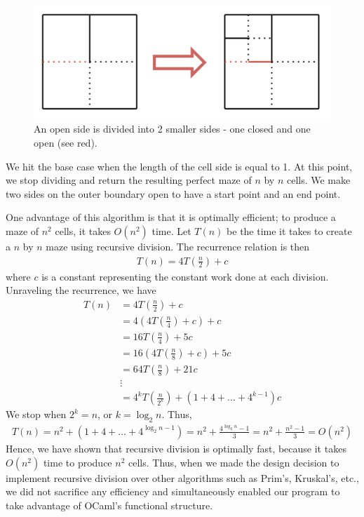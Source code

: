 \documentclass[11pt, margin=1in]{article}
\newcommand{\tab}{\par \qquad}
\begin{document}
\begin{figure}[H]
\begin{center}
\includegraphics[scale=0.7]{gen2.jpg}
\end{center}
\caption{An open side is divided into 2 smaller sides - one closed and one open (see red).}
\end{figure}

We hit the base case when the length of the cell side is equal to 1.  At this point, we stop dividing and return the resulting perfect maze of $n$ by $n$ cells.  We make two sides on the outer boundary open to have a start point and an end point.    

\tab One advantage of this algorithm is that it is optimally efficient; to produce a maze of $n^2$ cells, it takes $O(n^2)$ time.  Let $T(n)$ be the time it takes to create a $n$ by $n$ maze using recursive division.  The recurrence relation is then
\begin{align*}
T(n) = 4T\left(\frac{n}{2}\right) + c
\end{align*}  
where $c$ is a constant representing the constant work done at each division.  Unraveling the recurrence, we have
\begin{align*}
T(n) &= 4T\left(\frac{n}{2}\right) + c \\
&= 4\left(4T\left(\frac{n}{4}\right) + c\right) + c \\ 
&= 16 T\left(\frac{n}{4}\right) + 5c \\
&= 16 \left(4T\left(\frac{n}{8}\right) + c\right) + 5c \\ 
&= 64 T\left(\frac{n}{8}\right) + 21c \\
& \vdots \\
& = 4^k T\left(\frac{n}{2^k}\right) + (1 + 4 + \ldots + 4^{k-1})c
\end{align*}
We stop when $2^k = n$, or $k = \log_2n$.  Thus, 
\begin{align*}
T(n) = n^2 + (1 + 4 + \ldots + 4^{\log_2n-1}) = n^2 + \frac{4^{\log_2n} - 1}{3} = n^2 + \frac{n^2 - 1}{3} = O(n^2)
\end{align*}
Hence, we have shown that recursive division is optimally fast, because it takes $O(n^2)$ time to produce $n^2$ cells.  Thus, when we made the design decision to implement recursive division over other algorithms such as Prim's, Kruskal's, etc., we did not sacrifice any efficiency and simultaneously enabled our program to take advantage of OCaml's functional structure.
\end{document}
